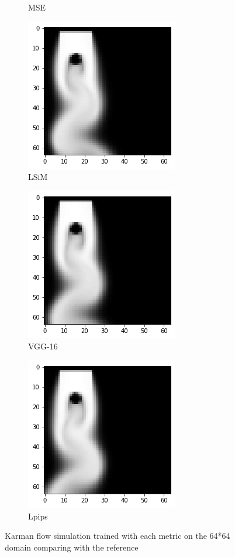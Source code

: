 \documentclass[a4paper,12pt,twoside]{report}
\begin{document}
\begin{figure}
\begin{subfigure}{0.32\textwidth}
		\caption{MSE}
	\end{subfigure}
	\begin{subfigure}{0.32\textwidth}
		\centering
		\includegraphics[scale=0.5]{karman_low/lsim}
		\caption{LSiM}
	\end{subfigure}
	\begin{subfigure}{0.32\textwidth}
		\centering
		\includegraphics[scale=0.5]{karman_low/vgg}
		\caption{VGG-16}
	\end{subfigure}
	\begin{subfigure}{0.32\textwidth}
		\centering
		\includegraphics[scale=0.5]{karman_low/lpips}
		\caption{Lpips}
	\end{subfigure}
	\caption{Karman flow simulation trained with each metric on the 64*64 domain comparing with the reference}
\end{figure}
\end{document}
